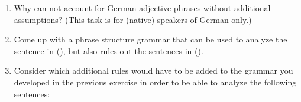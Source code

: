 {\begin{enumerate}
Revisit the German data in (\ref{ex-nounless-np}) and (\ref{ex-nounless-np-relational-noun})  and
explain why such an analysis and even a more general one as in () would
not extend to German.
\ea
NP $\to$ Det Adj
\z



\item Why can \xbart not account for German adjective phrases without additional assumptions? (This
  task is for (native) speakers of German only.)

\item Come up with a phrase structure grammar that can be used to analyze the sentence in (), but also
rules out the sentences in ().

      \eal
      \zl%
      \eal
      \zl
\item 
Consider which additional rules would have to be added to the grammar you developed in the previous exercise
	  in order to be able to analyze the following sentences:


\end{enumerate}}
